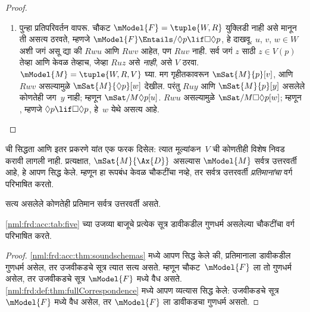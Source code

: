 \begin{proof}
\begin{enumerate}
    $z \in V(p)$ तेव्हा आणि केवळ तेव्हाच, जेव्हा
    $Ruz$, असे $V$ ठरवा (इतरत्र $V$ मनमाना आहे).
    $\mModel{M} =\tuple{W, R, V}$ घ्या. $V$ च्या
    व्याख्येनुसार $Ruz$ असलेल्या सर्व $z$ साठी
    $\mSat{M}{p}[z]$; म्हणून $\mSat{M}{\Box p}[u]$.
    गृहीतकावरून , म्हणजे $\Box p
    \lif \Box \Box p$, हे $u$ येथे सत्य आहे;
    म्हणून $\mSat{M}{\Box \Box
      p}[u]$. $Ruv$ आणि $Rvw$ असल्यामुळे
    $\mSat{M}{p}[w]$; पण $V$ च्या व्याख्येनुसार
    हे $Ruw$ असेल तेव्हाच शक्य आहे.
  \item पुन्हा प्रतिपरिवर्तन वापरू. चौकट
    $\mModel{F} = \tuple{W, R}$ युक्लिडी नाही असे
    मानून ती  असत्य ठरवते, म्हणजे
    $\mModel{F} \Entails/ \Diamond p \lif
      \Box\Diamond p$, हे दाखवू. $u$, $v$, $w \in W$
    अशी जगं असू द्या की $Rwu$ आणि $Rwv$ आहेत,
    पण $Ruv$ नाही. सर्व जगं $z$ साठी $z \in V(p)$
    तेव्हा आणि केवळ तेव्हाच, जेव्हा $Ruz$ असे
    \emph{नाही}, असे $V$ ठरवा. $\mModel{M}
    =\tuple{W, R, V}$ घ्या. मग गृहीतकावरून
    $\mSat{M}{p}[v]$, आणि $Rwv$ असल्यामुळे
    $\mSat{M}{\Diamond p}[w]$ देखील. परंतु
    $Ruy$ आणि $\mSat{M}{p}[y]$ असलेले कोणतेही
    जग~$y$ नाही; म्हणून $\mSat/{M}{\Diamond
      p}[u]$. $Rwu$ असल्यामुळे
    $\mSat/{M}{\Box\Diamond
      p}[w]$; म्हणून , म्हणजे
    $\Diamond p \lif \Box\Diamond p$, हे~$w$
    येथे असत्य आहे.
  \end{enumerate}
\end{proof}

 ची सिद्धता आणि इतर प्रकरणे यांत एक फरक दिसेल:
त्यात मूल्यांकन~$V$ ची कोणतीही विशेष निवड करावी लागली नाही. प्रत्यक्षात,
$\mSat{M}{\Ax{D}}$ असल्यास $\mModel{M}$ सर्वत्र
उत्तरवर्ती आहे, हे आपण सिद्ध केले. म्हणून 
हा रूपबंध केवळ चौकटींचा नव्हे, तर सर्वत्र उत्तरवर्ती
\emph{प्रतिमानांचा} वर्ग परिभाषित करतो.

\begin{cor}\label{nml:frd:def:prop:D-serial}
   सत्य असलेले कोणतेही प्रतिमान सर्वत्र उत्तरवर्ती असते.
\end{cor}

\begin{cor}
\ref{nml:frd:acc:tab:five} च्या उजव्या बाजूचे प्रत्येक
सूत्र डावीकडील गुणधर्म असलेल्या चौकटींचा
वर्ग परिभाषित करते.
\end{cor}

\begin{proof}
  \ref{nml:frd:acc:thm:soundschemas} मध्ये आपण सिद्ध केले की,
  प्रतिमानाला डावीकडील गुणधर्म असेल, तर उजवीकडचे
  सूत्र त्यात सत्य असते. म्हणून चौकट~$\mModel{F}$
  ला तो गुणधर्म असेल, तर उजवीकडचे सूत्र
  $\mModel{F}$ मध्ये वैध असते.
  \ref{nml:frd:def:thm:fullCorrespondence} मध्ये आपण व्यत्यास
  सिद्ध केले: उजवीकडचे सूत्र~$\mModel{F}$
  मध्ये वैध असेल, तर $\mModel{F}$ ला डावीकडचा
  गुणधर्म असतो.
\end{proof}

